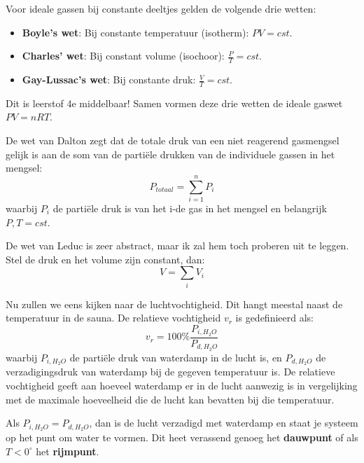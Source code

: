 Voor ideale gassen bij constante deeltjes gelden de volgende drie wetten:
\begin{itemize}
    \item \textbf{Boyle's wet}: Bij constante temperatuur (isotherm): \(PV = cst\).
    \item \textbf{Charles' wet}: Bij constant volume (isochoor): \(\frac{P}{T} = cst\).
    \item \textbf{Gay-Lussac's wet}: Bij constante druk: \(\frac{V}{T} = cst\).
\end{itemize}
Dit is leerstof 4e middelbaar! 
Samen vormen deze drie wetten de ideale gaswet \(PV = nRT\).

De wet van Dalton zegt dat de totale druk van een niet reagerend gasmengsel gelijk is aan de som van de partiële drukken van de individuele gassen in het mengsel:
\[P_{totaal} = \sum_{i=1}^n P_i\]
waarbij \(P_i\) de partiële druk is van het i-de gas in het mengsel en belangrijk \(P,T = cst\).

De wet van Leduc is zeer abstract, maar ik zal hem toch proberen uit te leggen. Stel de druk en het volume zijn constant, dan:
\[V = \sum_i V_i\]

Nu zullen we eens kijken naar de luchtvochtigheid. Dit hangt meestal naast de temperatuur in de sauna.
De relatieve vochtigheid \(v_r \) is gedefinieerd als:
\[v_r = 100\%\frac{P_{i,H_2O}}{P_{d,H_2O}}\]
waarbij \(P_{i,H_2O}\) de partiële druk van waterdamp in de lucht is, en \(P_{d,H_2O}\) de verzadigingsdruk van waterdamp bij de gegeven temperatuur is.
De relatieve vochtigheid geeft aan hoeveel waterdamp er in de lucht aanwezig is in vergelijking met de maximale hoeveelheid die de lucht kan bevatten bij die temperatuur.

Als \(P_{i,H_2O} = P_{d,H_2O}\), dan is de lucht verzadigd met waterdamp en staat je systeem op het punt om water te vormen. Dit heet verassend genoeg het \textbf{dauwpunt} of als \(T<0^\circ\) het \textbf{rijmpunt}.